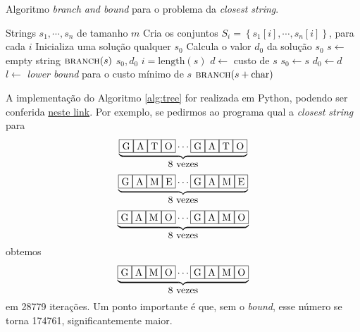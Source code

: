 \begin{algorithm}[H]
    \caption{Algoritmo \textit{branch and bound} para o problema da \textit{closest string}.}
    \label{alg:tree}
    \begin{algorithmic}
        \Require Strings $s_1, \cdots, s_n$ de tamanho $m$
        \State Cria os conjuntos $S_i = \left\{s_1[i], \cdots, s_n[i]\right\}$, para cada $i$
        \State Inicializa uma solução qualquer $s_0$
        \State Calcula o valor $d_0$ da solução $s_0$
        \State $s \gets$ empty string
        \State $\textsc{branch}(s)$        
        \State \Return $s_0, d_0$
        \State
            \State $i = \text{length}(s)$
                \State $d \gets$ custo de $s$
                    \State $s_0 \gets s$
                    \State $d_0 \gets d$
                \EndIf
                \State \Return
            \EndIf
            \State $l \gets$ \textit{lower bound} para o custo mínimo de $s$ 
                \State \Return
            \EndIf
                \State $\textsc{branch}(s + \text{char})$ 
            \EndFor
        \EndProcedure
    \end{algorithmic}
\end{algorithm}

A implementação do Algoritmo \ref{alg:tree} for realizada em Python, podendo ser conferida \href{https://github.com/lucasresck/data-structures-algorithms/blob/main/intractable_problems/scripts/closest_string_tree.py}{neste link}. Por exemplo, se pedirmos ao programa qual a \textit{closest string} para 
\[\overset{\underbrace{\text{\fbox{G}\fbox{A}\fbox{T}\fbox{O}}\cdots\text{\fbox{G}\fbox{A}\fbox{T}\fbox{O}}}}{\text{8 vezes}}\]
\[\overset{\underbrace{\text{\fbox{G}\fbox{A}\fbox{M}\fbox{E}}\cdots\text{\fbox{G}\fbox{A}\fbox{M}\fbox{E}}}}{\text{8 vezes}}\]
\[\overset{\underbrace{\text{\fbox{G}\fbox{A}\fbox{M}\fbox{O}}\cdots\text{\fbox{G}\fbox{A}\fbox{M}\fbox{O}}}}{\text{8 vezes}}\]
obtemos 
\[\overset{\underbrace{\text{\fbox{G}\fbox{A}\fbox{M}\fbox{O}}\cdots\text{\fbox{G}\fbox{A}\fbox{M}\fbox{O}}}}{\text{8 vezes}}\] em 28779 iterações. Um ponto importante é que, sem o \textit{bound}, esse número se torna 174761, significantemente maior.

